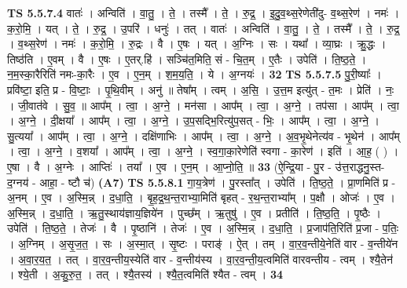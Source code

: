 \documentclass[17pt]{extarticle}
\begin{document}
                  \newline
                                \textbf{ TS 5.5.7.4} \newline
                  वातः॑ । अन्विति॑ । वा॒तु॒ । ते॒ । तस्मै᳚ । ते॒ । रु॒द्र॒ । इ॒दु॒व॒थ्स॒रेणेती॑दु- व॒थ्स॒रेण॑ । नमः॑ । क॒रो॒मि॒ । यत् । ते॒ । रु॒द्र॒ । उ॒परि॑ । धनुः॑ । तत् । वातः॑ । अन्विति॑ । वा॒तु॒ । ते॒ । तस्मै᳚ । ते॒ । रु॒द्र॒ । व॒थ्स॒रेण॑ । नमः॑ । क॒रो॒मि॒ । रु॒द्रः । वै । ए॒षः । यत् । अ॒ग्निः । सः । यथा᳚ । व्या॒घ्रः । क्रु॒द्धः । तिष्ठ॑ति । ए॒वम् । वै । ए॒षः । ए॒तर्.हि॑ । सञ्चि॑त॒मिति॒ सं - चि॒त॒म् । ए॒तैः । उपेति॑ । ति॒ष्ठ॒ते॒ । न॒म॒स्का॒रैरिति॑ नमः-का॒रैः । ए॒व । ए॒न॒म् । श॒म॒य॒ति॒ । ये । अ॒ग्नयः॑ । \textbf{  32} \newline
                  \newline
                                \textbf{ TS 5.5.7.5} \newline
                  पु॒री॒ष्याः᳚ । प्रवि॑ष्टा॒ इति॒ प्र - वि॒ष्टाः॒ । पृ॒थि॒वीम् । अनु॑ ॥ तेषा᳚म् । त्वम् । अ॒सि॒ । उ॒त्त॒म इत्यु॑त् - त॒मः । प्रेति॑ । नः॒ । जी॒वात॑वे । सु॒व॒ ॥ आप᳚म् । त्वा॒ । अ॒ग्ने॒ । मन॑सा । आप᳚म् । त्वा॒ । अ॒ग्ने॒ । तप॑सा । आप᳚म् । त्वा॒ । अ॒ग्ने॒ । दी॒क्षया᳚ । आप᳚म् । त्वा॒ । अ॒ग्ने॒ । उ॒प॒सद्भि॒रित्यु॑प॒सत् - भिः॒ । आप᳚म् । त्वा॒ । अ॒ग्ने॒ । सु॒त्यया᳚ । आप᳚म् । त्वा॒ । अ॒ग्ने॒ । दक्षि॑णाभिः । आप᳚म् । त्वा॒ । अ॒ग्ने॒ । अ॒व॒भृ॒थेनेत्य॑व - भृ॒थेन॑ । आप᳚म् । त्वा॒ । अ॒ग्ने॒ । व॒शया᳚ । आप᳚म् । त्वा॒ । अ॒ग्ने॒ । स्व॒गा॒का॒रेणेति॑ स्वगा - का॒रेण॑ । इति॑ । आ॒ह॒ ( ) । ए॒षा । वै । अ॒ग्नेः । आप्तिः॑ । तया᳚ । ए॒व । ए॒न॒म् । आ॒प्नो॒ति॒ ॥ \textbf{  33 } \newline
                  \newline
                      (ऐ॒न्द्रि॒या - पु॒र - उ॑त्त॒राद्धनु॒स्त- द॒ग्नय॑ - आहा॒ - ष्टौ च॑)  \textbf{(A7)} \newline \newline
                                \textbf{ TS 5.5.8.1} \newline
                  गा॒य॒त्रेण॑ । पु॒रस्ता᳚त् । उपेति॑ । ति॒ष्ठ॒ते॒ । प्रा॒णमिति॑ प्र - अ॒नम् । ए॒व । अ॒स्मि॒न्न् । द॒धा॒ति॒ । बृ॒ह॒द्र॒थ॒न्त॒राभ्या॒मिति॑ बृहत् - र॒थ॒न्त॒राभ्या᳚म् । प॒क्षौ । ओजः॑ । ए॒व । अ॒स्मि॒न्न् । द॒धा॒ति॒ । ऋ॒तु॒स्थाय॑ज्ञाय॒ज्ञिये॑न । पुच्छ᳚म् । ऋ॒तुषु॑ । ए॒व । प्रतीति॑ । ति॒ष्ठ॒ति॒ । पृ॒ष्ठैः । उपेति॑ । ति॒ष्ठ॒ते॒ । तेजः॑ । वै । पृ॒ष्ठानि॑ । तेजः॑ । ए॒व । अ॒स्मि॒न्न् । द॒धा॒ति॒ । प्र॒जाप॑ति॒रिति॑ प्र॒जा - प॒तिः॒ । अ॒ग्निम् । अ॒सृ॒ज॒त॒ । सः । अ॒स्मा॒त् । सृ॒ष्टः । पराङ्॑ । ऐ॒त् । तम् । वा॒र॒व॒न्तीये॒नेति॑ वार - व॒न्तीये॑न । अ॒वा॒र॒य॒त॒ । तत् । वा॒र॒व॒न्तीय॒स्येति॑ वार - व॒न्तीय॑स्य । वा॒र॒व॒न्ती॒य॒त्वमिति॑ वारवन्तीय - त्वम् । श्यै॒तेन॑ । श्ये॒ती । अ॒कु॒रु॒त॒ । तत् । श्यै॒तस्य॑ । श्यै॒त॒त्वमिति॑ श्यैत - त्वम् । \textbf{  34} \newline
\end{document}
